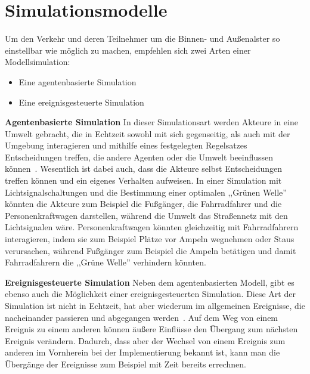 %
%
\section{Simulationsmodelle}\label{sec:simulationsmodelle}

Um den Verkehr und deren Teilnehmer um die Binnen- und Außenalster so einstellbar wie möglich zu machen, empfehlen sich zwei Arten einer Modellsimulation:

\begin{itemize}

    \item Eine agentenbasierte Simulation
    \item Eine ereignisgesteuerte Simulation

\end{itemize}

\textbf{Agentenbasierte Simulation}
In dieser Simulationsart werden Akteure in eine Umwelt gebracht, die in Echtzeit sowohl mit sich gegenseitig, als auch mit der Umgebung interagieren und mithilfe eines festgelegten Regelsatzes Entscheidungen treffen, die andere Agenten oder die Umwelt beeinflussen können~\cite{Baldwin2010}.
Wesentlich ist dabei auch, dass die Akteure selbst Entscheidungen treffen können und ein eigenes Verhalten aufweisen.
In einer Simulation mit Lichtsignalschaltungen und die Bestimmung einer optimalen ,,Grünen Welle'' könnten die Akteure zum Beispiel die Fußgänger, die Fahrradfahrer und die Personenkraftwagen darstellen, während die Umwelt das Straßennetz mit den Lichtsignalen wäre.
Personenkraftwagen könnten gleichzeitig mit Fahrradfahrern interagieren, indem sie zum Beispiel Plätze vor Ampeln wegnehmen oder Staus verursachen, während Fußgänger zum Beispiel die Ampeln betätigen und damit Fahrradfahrern die ,,Grüne Welle'' verhindern könnten.

\textbf{Ereignisgesteuerte Simulation}
Neben dem agentenbasierten Modell, gibt es ebenso auch die Möglichkeit einer ereignisgesteuerten Simulation.
Diese Art der Simulation ist nicht in Echtzeit, hat aber wiederum im allgemeinen Ereignisse, die nacheinander passieren und abgegangen werden~\cite{Baldwin2010}.
Auf dem Weg von einem Ereignis zu einem anderen können äußere Einflüsse den Übergang zum nächsten Ereignis verändern.
Dadurch, dass aber der Wechsel von einem Ereignis zum anderen im Vornherein bei der Implementierung bekannt ist, kann man die Übergänge der Ereignisse zum Beispiel mit Zeit bereits errechnen.
